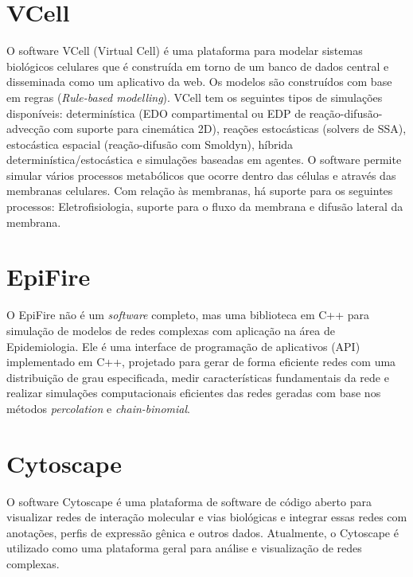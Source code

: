 \documentclass[
	12pt,				%
	openright,			%
	oneside,			%
	a4paper,			%
	main=brazil,
	english,			%
	]{ufsj-abntex2}
\begin{document}
\section{VCell}

O software VCell (Virtual Cell) \cite{vcell,VCellref1} é uma plataforma para modelar sistemas biológicos celulares que é construída em torno de um banco de dados central e disseminada como um aplicativo da web. Os modelos são construídos com base em regras (\textit{Rule-based modelling}). VCell tem os seguintes tipos de simulações disponíveis: determinística (EDO compartimental ou EDP de reação-difusão-advecção com suporte para cinemática 2D), reações estocásticas (solvers de SSA), estocástica espacial (reação-difusão com Smoldyn), híbrida determinística/estocástica e simulações baseadas em agentes. O software permite simular vários processos metabólicos que ocorre dentro das células e através das membranas celulares. Com relação às membranas, há suporte para os seguintes processos: Eletrofisiologia, suporte para o fluxo da membrana e difusão lateral da membrana. 

\section{EpiFire}

O EpiFire \cite{epifire} não é um \textit{software} completo, mas uma biblioteca em C++ para simulação de modelos de redes complexas com aplicação na área de Epidemiologia. Ele é uma interface de programação de aplicativos (API) implementado em C++, projetado para gerar de forma eficiente redes com uma distribuição de grau especificada, medir características fundamentais da rede e realizar simulações computacionais eficientes das redes geradas com base nos métodos \textit{percolation} e \textit{chain-binomial}. 

\section{Cytoscape}

O software Cytoscape \cite{shannon2003cytoscape} é uma plataforma de software de código aberto para visualizar redes de interação molecular e vias biológicas e integrar essas redes com anotações, perfis de expressão gênica e outros dados. Atualmente, o Cytoscape é utilizado como uma plataforma geral para análise e visualização de redes complexas. 

\end{document}
